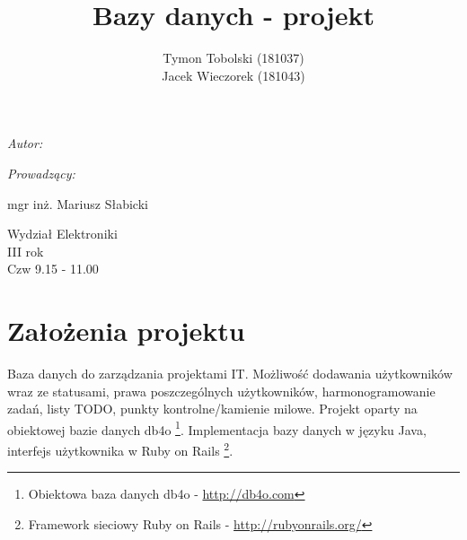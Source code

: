 \documentclass[wide,a4paper,titlepage,12pt] {article}
\title{Bazy danych - projekt}
\author{Tymon Tobolski (181037)\\ Jacek Wieczorek (181043)}
\makeatletter
\renewcommand{\maketitle}{
\begin{titlepage}
  \begin{center}
    \vspace*{3cm}
    \LARGE \@title \par
    \vspace{2cm}
    \textit{\small Autor:}\par
    \normalsize \@author\par \normalsize
    \vspace{3cm}
    \textit{\small Prowadzący:}\par
    mgr inż. Mariusz Słabicki \par
    \vspace{2cm}
    Wydział Elektroniki\\ III rok\\ Czw 9.15 - 11.00\par
    \vspace{4cm}
    \small \@date
  \end{center}
\end{titlepage}
}
\makeatother
\begin{document}
\maketitle
  \section{Założenia projektu}
  Baza danych do zarządzania projektami IT. Możliwość dodawania użytkowników wraz ze statusami, prawa poszczególnych użytkowników, harmonogramowanie zadań, listy TODO, punkty kontrolne/kamienie milowe. Projekt oparty na obiektowej bazie danych db4o \footnote{Obiektowa baza danych db4o - \url{http://db4o.com}}. Implementacja bazy danych w języku Java, interfejs użytkownika w Ruby on Rails \footnote{Framework sieciowy Ruby on Rails - \url{http://rubyonrails.org/}}.
\end{document}
